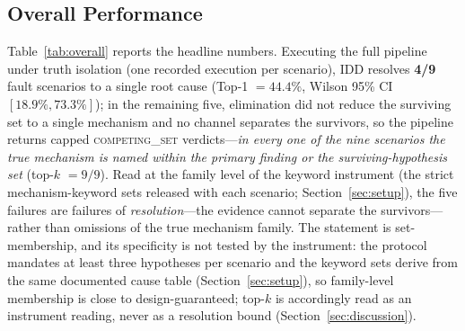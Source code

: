 \documentclass[preprint,10pt]{elsarticle}
\begin{document}
\subsection{Overall Performance}
\label{sec:overall}
Table~\ref{tab:overall} reports the headline numbers. Executing the full pipeline under truth isolation (one recorded execution per scenario), IDD resolves \textbf{4/9} fault scenarios to a single root cause (Top-1 $=44.4\%$, Wilson 95\% CI $[18.9\%,73.3\%]$); in the remaining five, elimination did not reduce the surviving set to a single mechanism and no channel separates the survivors, so the pipeline returns capped \mbox{\textsc{competing\_set}} verdicts---\emph{in every one of the nine scenarios the true mechanism is named within the primary finding or the surviving-hypothesis set} (top-$k$ $=9/9$). Read at the family level of the keyword instrument (the strict mechanism-keyword sets released with each scenario; Section~\ref{sec:setup}), the five failures are failures of \emph{resolution}---the evidence cannot separate the survivors---rather than omissions of the true mechanism family. The statement is set-membership, and its specificity is not tested by the instrument: the protocol mandates at least three hypotheses per scenario and the keyword sets derive from the same documented cause table (Section~\ref{sec:setup}), so family-level membership is close to design-guaranteed; top-$k$ is accordingly read as an instrument reading, never as a resolution bound (Section~\ref{sec:discussion}).
\end{document}
